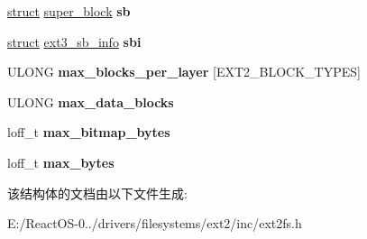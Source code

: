 \begin{DoxyCompactItemize}
\item 
\mbox{\label{struct___e_x_t2___v_c_b_adad427e786d9119442647309aeb8e80b}} 
\hyperlink{interfacestruct}{struct} \hyperlink{structsuper__block}{super\+\_\+block} {\bfseries sb}
\item 
\mbox{\label{struct___e_x_t2___v_c_b_a068e81c9c8f38fe1d88d66b4b234215c}} 
\hyperlink{interfacestruct}{struct} \hyperlink{structext3__sb__info}{ext3\+\_\+sb\+\_\+info} {\bfseries sbi}
\item 
\mbox{\label{struct___e_x_t2___v_c_b_ac8811a95ab37b2dbe5529294efb5d142}} 
U\+L\+O\+NG {\bfseries max\+\_\+blocks\+\_\+per\+\_\+layer} \mbox{[}E\+X\+T2\+\_\+\+B\+L\+O\+C\+K\+\_\+\+T\+Y\+P\+ES\mbox{]}
\item 
\mbox{\label{struct___e_x_t2___v_c_b_a176901f91a0a36ac2d437b38c739aa26}} 
U\+L\+O\+NG {\bfseries max\+\_\+data\+\_\+blocks}
\item 
\mbox{\label{struct___e_x_t2___v_c_b_a3b142bfe95cbf60b743fa6d1c52132c0}} 
loff\+\_\+t {\bfseries max\+\_\+bitmap\+\_\+bytes}
\item 
\mbox{\label{struct___e_x_t2___v_c_b_a3bf0a71d33e871ca8f53e68dfe8fce10}} 
loff\+\_\+t {\bfseries max\+\_\+bytes}
\end{DoxyCompactItemize}


该结构体的文档由以下文件生成\+:\begin{DoxyCompactItemize}
\item 
E\+:/\+React\+O\+S-\/0../drivers/filesystems/ext2/inc/ext2fs.\+h\end{DoxyCompactItemize}
